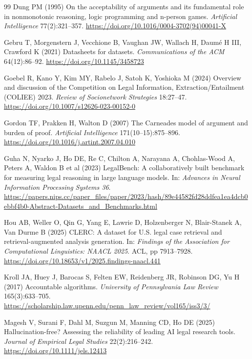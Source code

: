 \documentclass[12pt,a4paper]{article}
\begin{document}
\begin{thebibliography}{99}
Dung PM (1995) On the acceptability of arguments and its fundamental role in nonmonotonic reasoning, logic programming and n-person games. \textit{Artificial Intelligence} 77(2):321--357. \url{https://doi.org/10.1016/0004-3702(94)00041-X}

Gebru T, Morgenstern J, Vecchione B, Vaughan JW, Wallach H, Daum\'{e} H III, Crawford K (2021) Datasheets for datasets. \textit{Communications of the ACM} 64(12):86--92. \url{https://doi.org/10.1145/3458723}

Goebel R, Kano Y, Kim MY, Rabelo J, Satoh K, Yoshioka M (2024) Overview and discussion of the Competition on Legal Information, Extraction/Entailment (COLIEE) 2023. \textit{Review of Socionetwork Strategies} 18:27--47. \url{https://doi.org/10.1007/s12626-023-00152-0}

Gordon TF, Prakken H, Walton D (2007) The Carneades model of argument and burden of proof. \textit{Artificial Intelligence} 171(10--15):875--896. \url{https://doi.org/10.1016/j.artint.2007.04.010}

Guha N, Nyarko J, Ho DE, Re C, Chilton A, Narayana A, Chohlas-Wood A, Peters A, Waldon B et al (2023) LegalBench: A collaboratively built benchmark for measuring legal reasoning in large language models. In: \textit{Advances in Neural Information Processing Systems 36}. \url{https://papers.nips.cc/paper_files/paper/2023/hash/89e44582fd28ddfea1ea4dcb0ebbf4b0-Abstract-Datasets_and_Benchmarks.html}

Hou AB, Weller O, Qin G, Yang E, Lawrie D, Holzenberger N, Blair-Stanek A, Van Durme B (2025) CLERC: A dataset for U.S. legal case retrieval and retrieval-augmented analysis generation. In: \textit{Findings of the Association for Computational Linguistics: NAACL 2025}. ACL, pp 7913--7928. \url{https://doi.org/10.18653/v1/2025.findings-naacl.441}

Kroll JA, Huey J, Barocas S, Felten EW, Reidenberg JR, Robinson DG, Yu H (2017) Accountable algorithms. \textit{University of Pennsylvania Law Review} 165(3):633--705. \url{https://scholarship.law.upenn.edu/penn_law_review/vol165/iss3/3/}

Magesh V, Surani F, Dahl M, Suzgun M, Manning CD, Ho DE (2025) Hallucination-free? Assessing the reliability of leading AI legal research tools. \textit{Journal of Empirical Legal Studies} 22(2):216--242. \url{https://doi.org/10.1111/jels.12413}


\end{thebibliography}
\end{document}
